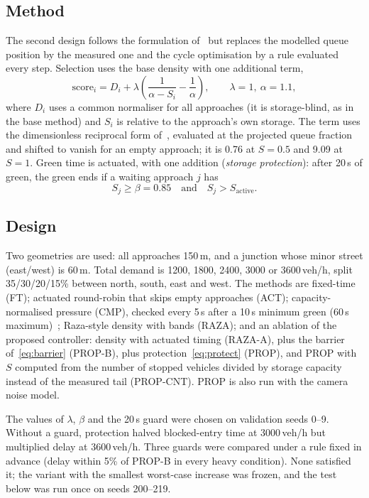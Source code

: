 \documentclass[journal]{IEEEtran}
\begin{document}
\subsection{Method}
The second design follows the formulation of~\cite{mohajerpoor2023} but replaces the
modelled queue position by the measured one and the cycle optimisation by a rule
evaluated every step. Selection uses the base density with one additional term,
\begin{equation}
\mathrm{score}_i = D_i+\lambda\left(\frac{1}{\alpha-S_i}-\frac{1}{\alpha}\right),
\qquad \lambda=1,\ \alpha=1.1 ,
\label{eq:barrier}
\end{equation}
where $D_i$ uses a common normaliser for all approaches (it is storage-blind, as in the
base method) and $S_i$ is relative to the approach's own storage. The term uses the dimensionless reciprocal form of~\cite{mohajerpoor2023}, evaluated at the projected queue fraction and shifted to vanish for an empty approach; it is 0.76 at $S=0.5$ and 9.09 at $S=1$. Green time is
actuated, with one addition (\emph{storage protection}): after 20\,s of green, the green
ends if a waiting approach $j$ has
\begin{equation}
S_j\ge\beta=0.85 \quad\text{and}\quad S_j>S_{\mathrm{active}} .
\label{eq:protect}
\end{equation}

\subsection{Design}
Two geometries are used: all approaches 150\,m, and a junction whose minor street
(east/west) is 60\,m. Total demand is 1200, 1800, 2400, 3000 or 3600\,veh/h, split
35/30/20/15\% between north, south, east and west. The methods are fixed-time (FT);
actuated round-robin that skips empty approaches (ACT); capacity-normalised pressure (CMP), checked every 5\,s after a 10\,s minimum green (60\,s maximum)~\cite{gregoire2015}; Raza-style density with bands (RAZA); and an
ablation of the proposed controller: density with actuated timing (RAZA-A), plus the
barrier of~\eqref{eq:barrier} (PROP-B), plus protection~\eqref{eq:protect} (PROP), and
PROP with $S$ computed from the number of stopped vehicles divided by storage capacity
instead of the measured tail (PROP-CNT). PROP is also run with the camera noise model.

The values of $\lambda$, $\beta$ and the 20\,s guard were chosen on validation seeds
0--9. Without a guard, protection halved blocked-entry time at 3000\,veh/h but
multiplied delay at 3600\,veh/h. Three guards were compared under a rule fixed in
advance (delay within 5\% of PROP-B in every heavy condition). None satisfied it; the
variant with the smallest worst-case increase was frozen, and the test below was run
once on seeds 200--219.
\end{document}
